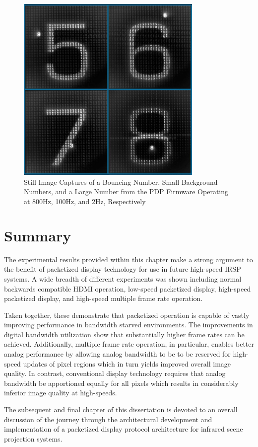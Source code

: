         \begin{figure}[t]
            \centering
            \includegraphics[width=0.80\textwidth]{fig/pdp_multi_frame_rate.jpg}
            \caption{Still Image Captures of a Bouncing Number, Small Background Numbers, and a Large Number from the PDP Firmware Operating at 800Hz, 100Hz, and 2Hz, Respectively}
            \label{fig:pdp_multi_frame_rate}
        \end{figure}

\section{Summary}
    The experimental results provided within this chapter make a strong argument to the benefit of packetized display technology for use in future high-speed IRSP systems. A wide breadth of different experiments was shown including normal backwards compatible HDMI operation, low-speed packetized display, high-speed packetized display, and high-speed multiple frame rate operation.

    Taken together, these demonstrate that packetized operation is capable of vastly improving performance in bandwidth starved environments. The improvements in digital bandwidth utilization show that substantially higher frame rates can be achieved. Additionally, multiple frame rate operation, in particular, enables better analog performance by allowing analog bandwidth to be to be reserved for high-speed updates of pixel regions which in turn yields improved overall image quality. In contrast, conventional display technology requires that analog bandwidth be apportioned equally for all pixels which results in considerably inferior image quality at high-speeds.

    The subsequent and final chapter of this dissertation is devoted to an overall discussion of the journey through the architectural development and implementation of a packetized display protocol architecture for infrared scene projection systems.
